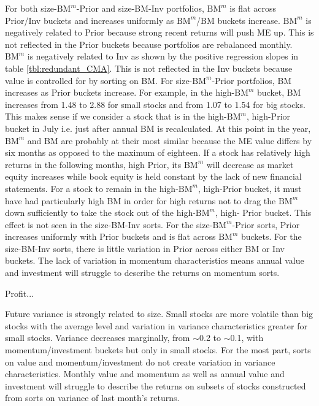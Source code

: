 For both size-$\text{BM}^m$-Prior and size-BM-Inv portfolios, $\text{BM}^m$ is
flat across Prior/Inv buckets and increases uniformly as $\text{BM}^m$/BM
buckets increase. $\text{BM}^m$ is negatively related to Prior because strong
recent returns will push ME up. This is not reflected in the Prior buckets
because portfolios are rebalanced monthly. $\text{BM}^m$ is negatively related
to Inv as shown by the positive regression slopes in table
\ref{tbl:redundant_CMA}. This is not reflected in the Inv buckets because value
is controlled for by sorting on BM. For size-$\text{BM}^m$-Prior portfolios, BM
increases as Prior buckets increase. For example, in the high-$\text{BM}^m$
bucket, BM increases from 1.48 to 2.88 for small stocks and from 1.07 to 1.54
for big stocks. This makes sense if we consider a stock that is in the
high-$\text{BM}^m$, high-Prior bucket in July i.e. just after annual BM is
recalculated. At this point in the year, $\text{BM}^m$ and BM are probably at
their most similar because the ME value differs by six months as opposed to the
maximum of eighteen. If a stock has relatively high returns in the following
months, high Prior, its $\text{BM}^m$ will decrease as market equity increases
while book equity is held constant by the lack of new financial statements. For
a stock to remain in the high-$\text{BM}^m$, high-Prior bucket, it must have
had particularly high BM in order for high returns not to drag the
$\text{BM}^m$ down sufficiently to take the stock out of the
high-$\text{BM}^m$, high- Prior bucket. This effect is not seen in the
size-BM-Inv sorts.
For the size-$\text{BM}^m$-Prior sorts, Prior increases uniformly
with Prior buckets and is flat across $\text{BM}^m$ buckets.
For the size-BM-Inv sorts, there is little variation in Prior across either
BM or Inv buckets.
The lack of variation in momentum characteristics means annual value and
investment will struggle to describe the returns on momentum
sorts.

Profit...

Future variance is strongly related to size. Small stocks are more volatile
than big stocks with the average level and variation in variance
characteristics greater for small stocks. Variance decreases marginally, from
$\sim$0.2 to $\sim$0.1, with momentum/investment buckets but only in small
stocks. For the most part, sorts on value and momentum/investment do not create
variation in variance characteristics. Monthly value and momentum as well as
annual value and investment will struggle to describe the returns on subsets of
stocks constructed from sorts on variance of last month's returns.

